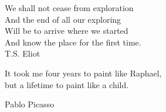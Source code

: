 
\thispagestyle{empty}
\mbox{}
\begin{flushright}

{\selectfont 
\vspace{6cm}

We shall not cease from exploration 	\\
And the end of all our exploring    	\\
Will be to arrive where we started  	\\
And know the place for the first time. 	\\

T.S. Eliot 

\vspace{3cm}

It took me four years to paint like Raphael, \\
but a lifetime to paint like a child.

Pablo Picasso

}
\end{flushright}


